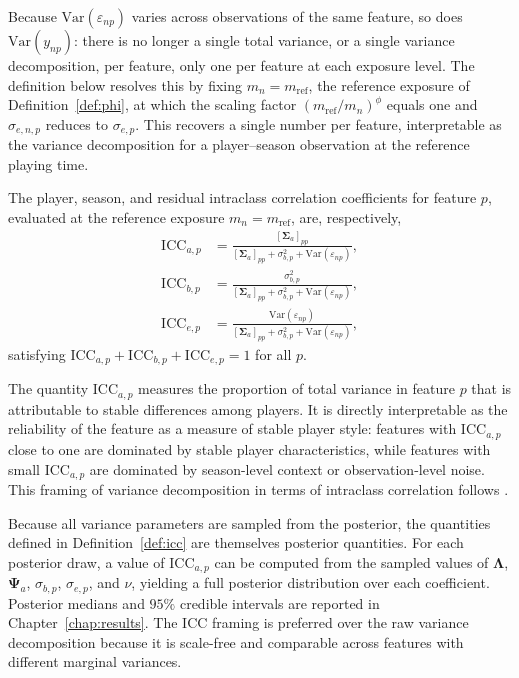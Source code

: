 Because $\mathrm{Var}(\varepsilon_{np})$ varies across observations of the same feature, so does $\mathrm{Var}(y_{np})$: there is no longer a single total variance, or a single variance decomposition, per feature, only one per feature at each exposure level. The definition below resolves this by fixing $m_n = m_{\mathrm{ref}}$, the reference exposure of Definition~\ref{def:phi}, at which the scaling factor $(m_{\mathrm{ref}}/m_n)^\phi$ equals one and $\sigma_{e,n,p}$ reduces to $\sigma_{e,p}$. This recovers a single number per feature, interpretable as the variance decomposition for a player--season observation at the reference playing time.

\begin{definition}
\label{def:icc}
The player, season, and residual intraclass correlation coefficients for feature $p$, evaluated at the reference exposure $m_n = m_{\mathrm{ref}}$, are, respectively,
\begin{align}
\mathrm{ICC}_{a,p} &= \frac{[\boldsymbol{\Sigma}_a]_{pp}}{[\boldsymbol{\Sigma}_a]_{pp} + \sigma_{b,p}^2 + \mathrm{Var}(\varepsilon_{np})},
\label{eq:icc_a} \\[4pt]
\mathrm{ICC}_{b,p} &= \frac{\sigma_{b,p}^2}{[\boldsymbol{\Sigma}_a]_{pp} + \sigma_{b,p}^2 + \mathrm{Var}(\varepsilon_{np})},
\label{eq:icc_b} \\[4pt]
\mathrm{ICC}_{e,p} &= \frac{\mathrm{Var}(\varepsilon_{np})}{[\boldsymbol{\Sigma}_a]_{pp} + \sigma_{b,p}^2 + \mathrm{Var}(\varepsilon_{np})},
\label{eq:icc_e}
\end{align}
satisfying $\mathrm{ICC}_{a,p} + \mathrm{ICC}_{b,p} + \mathrm{ICC}_{e,p} = 1$ for all $p$.
\end{definition}

The quantity $\mathrm{ICC}_{a,p}$ measures the proportion of total variance in feature $p$ that is attributable to stable differences among players. It is directly interpretable as the reliability of the feature as a measure of stable player style: features with $\mathrm{ICC}_{a,p}$ close to one are dominated by stable player characteristics, while features with small $\mathrm{ICC}_{a,p}$ are dominated by season-level context or observation-level noise. This framing of variance decomposition in terms of intraclass correlation follows \cite{shrout1979intraclass}.

\begin{remark}
\label{rem:bayesian_icc}
Because all variance parameters are sampled from the posterior, the quantities defined in Definition~\ref{def:icc} are themselves posterior quantities. For each posterior draw, a value of $\mathrm{ICC}_{a,p}$ can be computed from the sampled values of $\boldsymbol{\Lambda}$, $\boldsymbol{\Psi}_a$, $\sigma_{b,p}$, $\sigma_{e,p}$, and $\nu$, yielding a full posterior distribution over each coefficient. Posterior medians and $95\%$ credible intervals are reported in Chapter~\ref{chap:results}. The ICC framing is preferred over the raw variance decomposition because it is scale-free and comparable across features with different marginal variances.
\end{remark}


